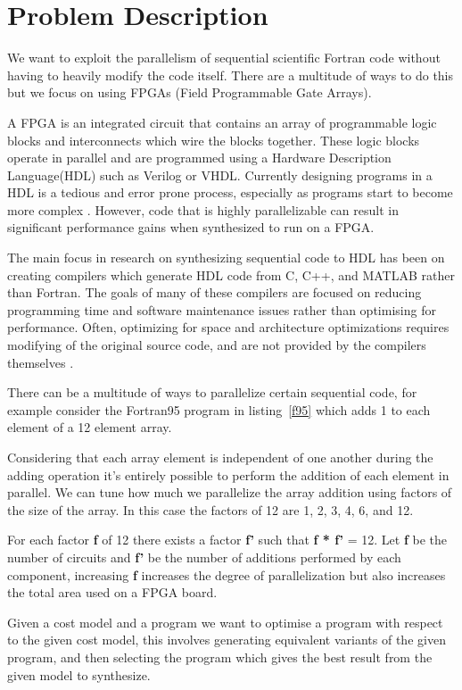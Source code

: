 \section{Problem Description}

We want to exploit the parallelism of sequential scientific Fortran code without
having to heavily modify the code itself. There are a multitude of ways to do this but
we focus on using FPGAs (Field Programmable Gate Arrays). 

A FPGA is an integrated circuit that contains an array of programmable logic blocks and interconnects which
wire the blocks together. These logic blocks operate in parallel and are programmed using a Hardware Description Language(HDL)
such as Verilog or VHDL. Currently designing programs in a HDL is a tedious and error prone process, especially
as programs start to become more complex \cite{complex}.
However, code that is highly parallelizable can result in significant performance gains when synthesized to
run on a FPGA.

The main focus in research on synthesizing sequential code to HDL has been on creating compilers which generate
HDL code from C, C++, and MATLAB rather than Fortran. The goals of many of these compilers are focused on reducing programming 
time and software maintenance issues rather than optimising for performance. Often, optimizing
for space and architecture optimizations requires modifying of the original source code, and are not
provided by the compilers themselves \cite{hlstools}.

There can be a multitude of ways to parallelize certain sequential code, for example consider the Fortran95 program in
listing~\ref{f95} which adds 1 to each element of a 12 element array.



Considering that each array element is independent of one another during the adding operation
it's entirely possible to perform the addition of each element in parallel. We can tune how much
we parallelize the array addition using factors of the size of the array. In this case the factors of 12 are 1, 2, 3, 4, 6, and 12.

For each factor \textbf{f} of 12 there exists a factor \textbf{f'} such that \textbf{f * f'} = 12. Let \textbf{f} be the number of 
circuits and \textbf{f'} be the number of additions performed by each component, increasing \textbf{f} increases the degree of 
parallelization but also increases the total area used on a FPGA board. 

Given a cost model and a program we want to optimise a program with respect to the given cost model, this
involves generating equivalent variants of the given program, and then selecting the program which
gives the best result from the given model to synthesize.
